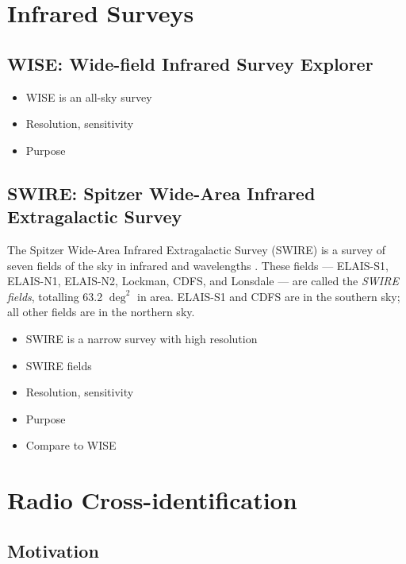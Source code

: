     \section{Infrared Surveys}
    \label{sec:infrared-surveys}

        \subsection{WISE: Wide-field Infrared Survey Explorer}
        \label{sec:wise}

            \begin{itemize}
                \item WISE is an all-sky survey
                \item Resolution, sensitivity
                \item Purpose
            \end{itemize}

        \subsection{SWIRE: Spitzer Wide-Area Infrared Extragalactic Survey}
        \label{sec:swire}

            The Spitzer Wide-Area Infrared Extragalactic Survey (SWIRE) is a survey of seven fields of the sky in infrared and wavelengths \citep{lonsdale03}. These fields --- ELAIS-S1, ELAIS-N1, ELAIS-N2, Lockman, CDFS, and Lonsdale --- are called the \emph{SWIRE fields}, totalling 63.2 $\deg^2$ in area. ELAIS-S1 and CDFS are in the southern sky; all other fields are in the northern sky.

            \begin{itemize}
                \item SWIRE is a narrow survey with high resolution
                \item SWIRE fields
                \item Resolution, sensitivity
                \item Purpose
                \item Compare to WISE
            \end{itemize}

    \section{Radio Cross-identification}
    \label{sec:radio-cross-identification}

        \subsection{Motivation}
        \label{sec:cross-identification-motivation}

